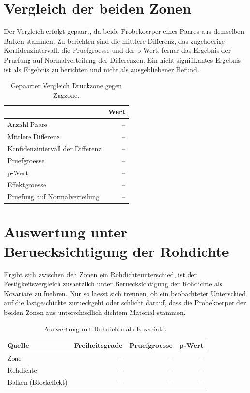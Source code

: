 \section{Vergleich der beiden Zonen}
\label{sec:zone-comparison}

Der Vergleich erfolgt gepaart, da beide Probekoerper eines Paares aus
demselben Balken stammen. Zu berichten sind die mittlere Differenz, das
zugehoerige Konfidenzintervall, die Pruefgroesse und der p-Wert, ferner das
Ergebnis der Pruefung auf Normalverteilung der Differenzen. Ein nicht
signifikantes Ergebnis ist als Ergebnis zu berichten und nicht als
ausgebliebener Befund.

\begin{table}[H]
\centering
\caption{Gepaarter Vergleich Druckzone gegen Zugzone.}
\label{tab:paired-test}
\begin{tabular}{@{}lr@{}}
\toprule
& \textbf{Wert} \\
\midrule
Anzahl Paare                          & -- \\
Mittlere Differenz                    & -- \\
Konfidenzintervall der Differenz      & -- \\
Pruefgroesse                          & -- \\
p-Wert                                & -- \\
Effektgroesse                         & -- \\
Pruefung auf Normalverteilung         & -- \\
\bottomrule
\end{tabular}
\end{table}

\section{Auswertung unter Beruecksichtigung der Rohdichte}
\label{sec:covariate}

Ergibt sich zwischen den Zonen ein Rohdichteunterschied, ist der
Festigkeitsvergleich zusaetzlich unter Beruecksichtigung der Rohdichte als
Kovariate zu fuehren. Nur so laesst sich trennen, ob ein beobachteter
Unterschied auf die \gls{lastgeschichte} zurueckgeht oder schlicht darauf,
dass die Probekoerper der beiden Zonen aus unterschiedlich dichtem Material
stammen.

\begin{table}[H]
\centering
\caption{Auswertung mit Rohdichte als Kovariate.}
\label{tab:ancova}
\begin{tabular}{@{}lrrr@{}}
\toprule
\textbf{Quelle} & \textbf{Freiheitsgrade} & \textbf{Pruefgroesse}
& \textbf{p-Wert} \\
\midrule
Zone                     & -- & -- & -- \\
Rohdichte                & -- & -- & -- \\
Balken (Blockeffekt)     & -- & -- & -- \\
\bottomrule
\end{tabular}
\end{table}
